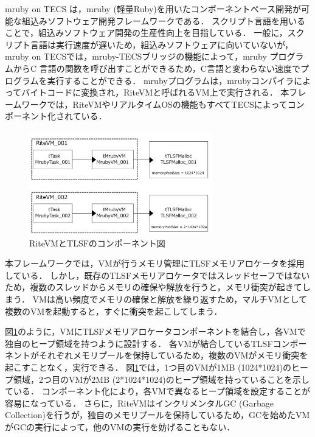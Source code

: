 \documentclass[submit,techrep]{ipsj_v2/UTF8/ipsj}
\begin{document}
mruby on TECS は，mruby (軽量Ruby)\cite{par:mruby}\cite{url:mruby}を用いたコンポーネントベース開発が可能な組込みソフトウェア開発フレームワークである\cite{par:mrubyonTECS}\cite{par:mrubyonTECS2}．
スクリプト言語を用いることで，組込みソフトウェア開発の生産性向上を目指している．
一般に，スクリプト言語は実行速度が遅いため，組込みソフトウェアに向いていないが，mruby on TECSでは，mruby-TECSブリッジの機能によって，mruby プログラムからC 言語の関数を呼び出すことができるため，C言語と変わらない速度でプログラムを実行することができる．
mrubyプログラムは，mrubyコンパイラによってバイトコードに変換され，RiteVMと呼ばれるVM上で実行される．
本フレームワークでは，RiteVMやリアルタイムOSの機能もすべてTECSによってコンポーネント化されている．



\begin{figure}[t]
    \centering
    \includegraphics[width=8cm,clip]{figure/UseCase_mruby.pdf}
    \caption{RiteVMとTLSFのコンポーネント図}
    \label{fig:UseCase_mruby}
\end{figure}

本フレームワークでは，VMが行うメモリ管理にTLSFメモリアロケータを採用している．
しかし，既存のTLSFメモリアロケータではスレッドセーフではないため，複数のスレッドからメモリの確保や解放を行うと，メモリ衝突が起きてしまう．
VMは高い頻度でメモリの確保と解放を繰り返すため，マルチVMとして複数のVMを起動すると，すぐに衝突を起こしてしまう．

図\ref{fig:UseCase_mruby}のように，VMにTLSFメモリアロケータコンポーネントを結合し，各VMで独自のヒープ領域を持つように設計する．
各VMが結合しているTLSFコンポーネントがそれぞれメモリプールを保持しているため，複数のVMがメモリ衝突を起こすことなく，実行できる．
図\ref{fig:UseCase_mruby}では，1つ目のVMが1MB (1024*1024)のヒープ領域，2つ目のVMが2MB (2*1024*1024)のヒープ領域を持っていることを示している．
コンポーネント化により，各VMで異なるヒープ領域を設定することが容易になっている．
さらに，RiteVMはインクリメンタルGC (Garbage Collection)を行うが，独自のメモリプールを保持しているため，GCを始めたVMがGCの実行によって，他のVMの実行を妨げることもない．
    
\end{document}
